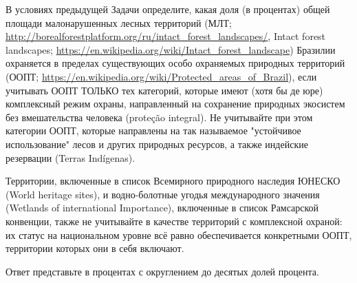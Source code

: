 
В условиях предыдущей Задачи определите, какая доля (в процентах) общей площади малонарушенных лесных территорий 
(МЛТ; \url{http://borealforestplatform.org/ru/intact_forest_landscapes/}, Intact forest landscapes; \url{https://en.wikipedia.org/wiki/Intact_forest_landscape}) 
Бразилии охраняется в пределах существующих особо охраняемых природных территорий (ООПТ; \url{https://en.wikipedia.org/wiki/Protected_areas_of_Brazil}), если учитывать ООПТ ТОЛЬКО тех категорий, которые имеют (хотя бы де юре) комплексный режим охраны, направленный на сохранение природных экосистем без вмешательства человека (proteção integral). Не учитывайте при этом категории ООПТ, которые направлены на так называемое "устойчивое использование" лесов и других природных ресурсов, а также индейские резервации (Terras Indígenas).

Территории, включенные в список Всемирного природного наследия ЮНЕСКО (World heritage sites), и водно-болотные угодья международного значения (Wetlands of international Importance), включенные в список Рамсарской конвенции, также не учитывайте в качестве территорий с комплексной охраной: их статус на национальном уровне всё равно обеспечивается конкретными ООПТ, территории которых они в себя включают.

Ответ представьте в процентах с округлением до десятых долей процента. 